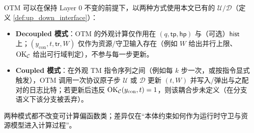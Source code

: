 \begin{definition}\label{def:observer_tm_coupling_modes}
OTM 可以在保持 Layer 0 不变的前提下，以两种方式使用本文已有的 \(\mathcal U/\mathcal D\)（定义 \ref{def:up_down_interface}）：
\begin{itemize}
  \item \textbf{Decoupled 模式}：OTM 的外观计算仅作用在 \((q,\mathsf{tp},\mathsf{hp})\) 与（可选）\(\mathsf{hist}\) 上；\((y_{\mathrm{con}},t,\mathsf{tr},W)\) 仅作为资源/守卫输入存在（例如 \(W\) 给出并行上限、\(\mathrm{OK}_{\mathcal{C}}\) 给出可行域判定），不参与每一步更新。
  \item \textbf{Coupled 模式}：在外观 TM 指令序列之间（例如每 \(k\) 步一次，或按指令显式触发），OTM 调用一次协议原子步 \(\mathcal U\) 或 \(\mathcal D\) 更新 \((t,W)\) 并写入/弹出与之配对的日志比特；若更新后违反 \(\mathrm{OK}_{\mathcal{C}}(y_{\mathrm{con}},t)=1\)，则该耦合步未定义（在分支语义下该分支被丢弃）。
\end{itemize}
两种模式都不改变可计算偏函数类；差异仅在“本体约束如何作为运行时守卫与资源模型进入计算过程”。
\end{definition}

